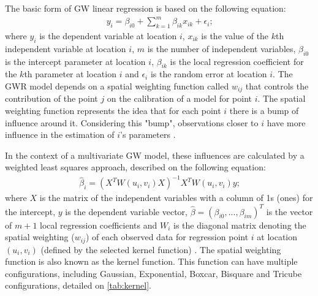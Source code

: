 The basic form of GW linear regression is based on the following equation:\begin{align}
    y_i = \beta_{i0} + \sum_{k=1}^{m} \beta_{ik} x_{ik} + \epsilon_i \mbox{;}
    \label{eq:gwr}
\end{align} where $y_i$ is the dependent variable at location $i$, $x_{ik}$ is the value of the $k$th independent variable at location $i$, $m$ is the number of independent variables, $\beta_{i0}$ is the intercept parameter at location $i$, $\beta_{ik}$ is the local regression coefficient for the $k$th parameter at location $i$ and $\epsilon_i$ is the random error at location $i$. The GWR model depends on a spatial weighting function called $w_{ij}$ that controls the contribution of the point $j$ on the calibration of a model for point $i$. The spatial weighting function represents the idea that for each point $i$ there is a bump of influence around it. Considering this "bump", observations closer to $i$ have more influence in the estimation of $i$'s parameters \cite{Brunsdon2010,Gollini2013}.

In the context of a multivariate GW model, these influences are calculated by a weighted least squares approach, described on the following equation: \begin{align}
    \hat{\beta}_i = (X^T W(u_i,v_i)X)^{-1} X^T W(u_i, v_i)y \mbox{;}
    \label{eq:wls}
\end{align} where $X$ is the matrix of the independent variables with a column of 1s (ones) for the intercept, $y$ is the dependent variable vector, $\hat{\beta} = (\beta_{i0},...,\beta_{im})^T$ is the vector of $m + 1$ local regression coefficients and $W_i$ is the diagonal matrix denoting the spatial weighting ($w_{ij}$) of each observed data for regression point $i$ at location $(u_i, v_i)$ (defined by the selected kernel function) \cite{Gollini2013}. The spatial weighting function is also known as the kernel function. This function can have multiple configurations, including Gaussian, Exponential, Boxcar, Bisquare and Tricube configurations, detailed on \autoref{tab:kernel}.

